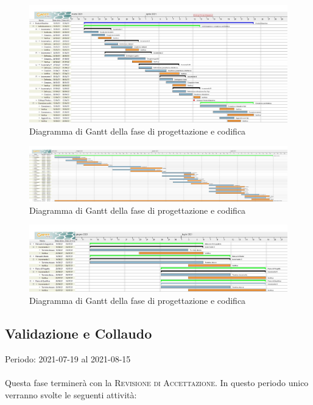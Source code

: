 \documentclass[../piano_di_progetto.tex]{subfiles}
\begin{document}
\begin{figure}[H]
    \centering
    \includegraphics[width=18cm]{src/img/gantt/redazione_architettura_RQ.jpg}
    \caption{Diagramma di Gantt della fase di progettazione e codifica}

\end{figure}

\begin{figure}[H]
    \centering
    \includegraphics[width=18cm]{src/img/gantt/stesura_codiceRQ.jpg}
    \caption{Diagramma di Gantt della fase di progettazione e codifica}

\end{figure}

\begin{figure}[H]
    \centering
    \includegraphics[width=18cm]{src/img/gantt/documenti_RQ_parte2.jpg}
    \caption{Diagramma di Gantt della fase di progettazione e codifica}
\end{figure}


\subsection{Validazione e Collaudo}%
\label{sub:valid_coll}
Periodo: 2021-07-19 al 2021-08-15 \\ \\ 
Questa fase terminerà con la \textsc{Revisione di Accettazione}. In questo periodo unico verranno svolte le seguenti attività:
\end{document}
